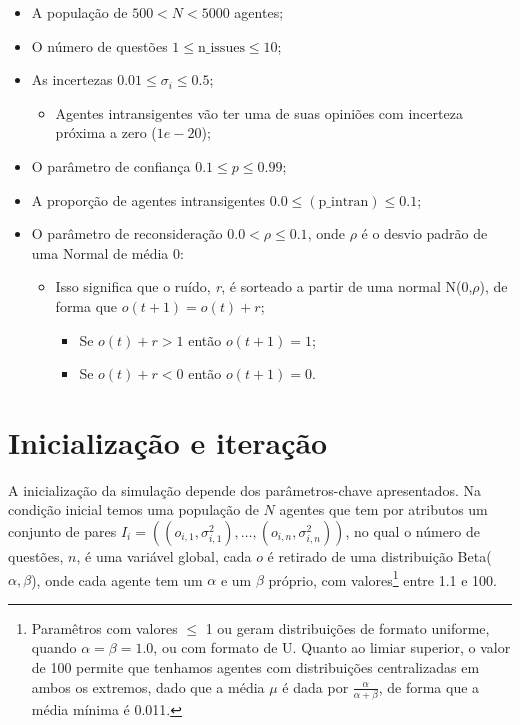 \begin{itemize}
\item A população de \(500 < N < 5000\) agentes;
\item O número de questões \(1 \leq \text{n\_issues} \leq 10\); 

\item As incertezas \(0.01 \leq \sigma_i \leq 0.5\);
  \begin{itemize}
  \item Agentes intransigentes vão ter uma de suas opiniões com incerteza
    próxima a zero (\(1e-20\));
  \end{itemize}

\item O parâmetro de confiança \(0.1 \leq p \leq 0.99\);
  
\item A proporção de agentes intransigentes \(0.0 \leq (\text{p\_intran}) \leq 0.1\);

\item O parâmetro de reconsideração \(0.0 < \rho  \leq 0.1\), onde \(\rho\) é o desvio
  padrão de uma Normal de média 0:
  \begin{itemize}
  \item Isso significa que o ruído, \textit{r}, é sorteado a partir de uma
    normal N(0,\(\rho\)), de forma que \(o(t+1) = o(t) + r\);

    \begin{itemize}
    \item Se \(o(t) + r > 1\) então \(o(t+1) = 1\);
    \item Se \(o(t) + r < 0\) então \(o(t+1) = 0\).
    \end{itemize}   
  \end{itemize}
 
\end{itemize}

\section{Inicialização e iteração}

A inicialização da simulação depende dos parâmetros-chave apresentados. Na
condição inicial temos uma população de \(N\) agentes que tem por atributos um
conjunto de pares \(I_i = ((o_{i,1},\sigma_{i,1}^2), \ldots,
(o_{i,n},\sigma_{i,n}^2))\), no qual o número de questões, \(n\), é uma variável
global, cada \(o\) é retirado de uma distribuição Beta(\(\alpha,\beta\)), onde
cada agente tem um \(\alpha\) e um \(\beta\) próprio, com
valores\footnote{Paramêtros com valores \(\leq\) 1 ou geram distribuições de
  formato uniforme, quando \(\alpha = \beta = 1.0\), ou com formato de U. Quanto
  ao limiar superior, o valor de 100 permite que tenhamos agentes com
  distribuições centralizadas em ambos os extremos, dado que a média \(\mu\) é
  dada por \(\frac{\alpha}{\alpha + \beta}\), de forma que a média mínima é
  0.011.} entre 1.1 e 100.

